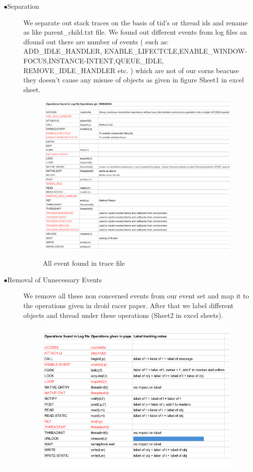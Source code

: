 \documentclass[11pt]{report}
\begin{document}
\begin{description}
 \item[$\bullet$Separation] We separate out  stack traces on the basis of tid's or thread ids and rename as like parent\_child.txt file. 
We found out different events from log files an dfound out there are number of events ( such as: ADD\_IDLE\_HANDLER, ENABLE\_LIFECTCLE,ENABLE\_WINDOW-FOCUS,INSTANCE-INTENT,QUEUE\_IDLE,
REMOVE\_IDLE\_HANDLER etc. ) which are not of our corns beacuse they doesn't cause any misuse of objects as given in figure Sheet1 in excel sheet. \\
\begin{figure}
\includegraphics[width=150mm]{./images/sheet-1.png}\\
\caption{All event found in trace file}
\end{figure}
\item[$\bullet$Removal of Unnecessary Events] We remove all these non concerned events from our event set and map it to the operations given in droid racer paper. After that we label different objects and thread under
these operations (Sheet2 in excel sheets).\\
\begin{figure}
\centering
\includegraphics[width=150mm]{./images/sheet-2.png}\\

\end{figure}
\end{description}
\end{document}
